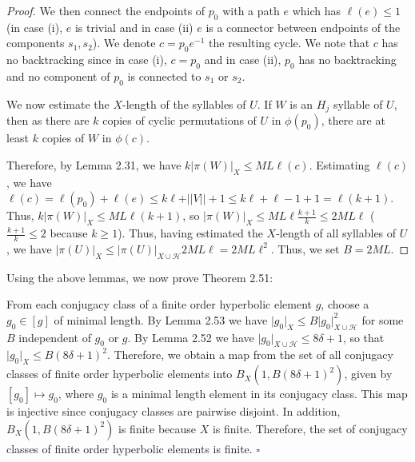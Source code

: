 \documentclass[12pt]{article}
\newcommand{\vs}{\vskip10pt}
\begin{document}
\begin{proof}
		\vs
		
		We then connect the endpoints of $p_0$ with a path $e$ which has $\ell(e) \leq 1$ (in case (i), $e$ is trivial and in case (ii) $e$ is a connector between endpoints of the components $s_1, s_2$). We denote $c = p_0 e^{-1}$ the resulting cycle. We note that $c$ has no backtracking since in case (i), $c = p_0$ and in case (ii), $p_0$ has no backtracking and no component of $p_0$ is connected to $s_1$ or $s_2$. 
		
		\vs 
		
		We now estimate the $X$-length of the syllables of $U$. If $W$ is an $H_j$ syllable of $U$, then as there are $k$ copies of cyclic permutations of $U$ in $\phi(p_0)$, there are at least $k$ copies of $W$ in $\phi(c)$. 
		
		\vs 
		
		Therefore, by Lemma 2.31, we have $k \vert \pi(W) \vert_X \leq ML \ell (c)$. Estimating $\ell(c)$, we have $\ell(c) = \ell(p_0) + \ell(e) \leq k \ell + \vert \vert V \vert \vert + 1 \leq k \ell + \ell - 1 + 1 = \ell (k+1)$. Thus, $k \vert \pi(W) \vert_X \leq ML \ell (k+1)$, so $\vert \pi(W) \vert_X \leq ML \ell \frac{k + 1}{k} \leq 2ML \ell$ ($\frac{k+1}{k} \leq 2$ because $k \geq 1$). Thus, having estimated the $X$-length of all syllables of $U$, we have $\vert \pi(U) \vert_X \leq \vert \pi(U) \vert_{X \cup \mathcal{H}} 2ML \ell = 2 ML \ell^2$. Thus, we set $B = 2ML$.
		
	\end{proof}

	Using the above lemmas, we now prove Theorem 2.51: 
	
	\vs 
	
	From each conjugacy class of a finite order hyperbolic element $g$, choose a $g_0 \in [g]$ of minimal length. By Lemma 2.53 we have $\vert g_0 \vert_X \leq B \vert g_0 \vert_{X \cup \mathcal{H}}^2$ for some $B$ independent of $g_0$ or $g$. By Lemma 2.52 we have $\vert g_0 \vert_{X \cup \mathcal{H}} \leq 8 \delta + 1$, so that $\vert g_0 \vert_X \leq B(8 \delta + 1)^2$. Therefore, we obtain a map from the set of all conjugacy classes of finite order hyperbolic elements into $B_X(1, B(8 \delta + 1)^2)$, given by $[g_0] \mapsto g_0$, where $g_0$ is a minimal length element in its conjugacy class. This map is injective since conjugacy classes are pairwise disjoint. In addition, $B_X(1, B(8 \delta + 1)^2)$ is finite because $X$ is finite. Therefore, the set of conjugacy classes of finite order hyperbolic elements is finite. $\square$
	
\end{document}
